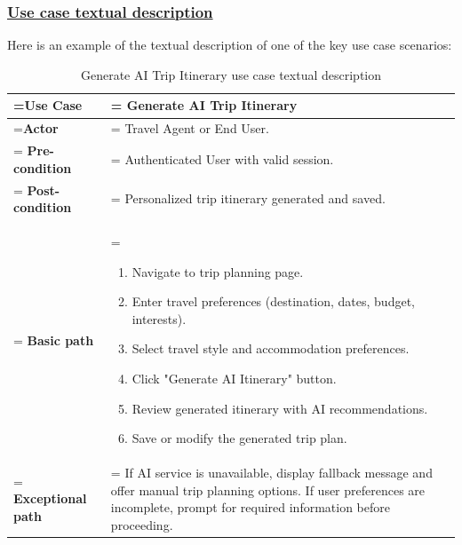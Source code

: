 \subsubsection{\underline{Use case textual description}}
Here is an example of the textual description of one of the key use case scenarios:
\begin{table}[H]
    \renewcommand{\arraystretch}{1.5}%
    \caption{Generate AI Trip Itinerary use case textual description}
    \centering
    \medskip
    \begin{tabularx}{1\textwidth} {
            | >{\hsize=0.5\hsize\linewidth=\hsize\centering\arraybackslash}X
            | >{\hsize=1.5\hsize\linewidth=\hsize\justifying\arraybackslash}X |}
        \hline
        \textbf {Use Case}         & \noindent Generate AI Trip Itinerary                                                                                                                                                            \\
        \hline
        \textbf {Actor}            & \noindent Travel Agent or End User.                                                                                                                                                             \\
        \hline
        \textbf {Pre-condition}    & \noindent Authenticated User with valid session.                                                                                                                                                \\
        \hline
        \textbf {Post-condition}   & \noindent Personalized trip itinerary generated and saved.                                                                                                                                      \\
        \hline
        \textbf {Basic path}       & \noindent    \begin{enumerate}
            \item Navigate to trip planning page.
            \item Enter travel preferences (destination, dates, budget, interests).
            \item Select travel style and accommodation preferences.
            \item Click "Generate AI Itinerary" button.
            \item Review generated itinerary with AI recommendations.
            \item Save or modify the generated trip plan.
        \end{enumerate}                                                                                                                                                         \\
        \hline
        \textbf {Exceptional path} & \noindent If AI service is unavailable, display fallback message and offer manual trip planning options. If user preferences are incomplete, prompt for required information before proceeding. \\
        \hline
    \end{tabularx}
\end{table}

